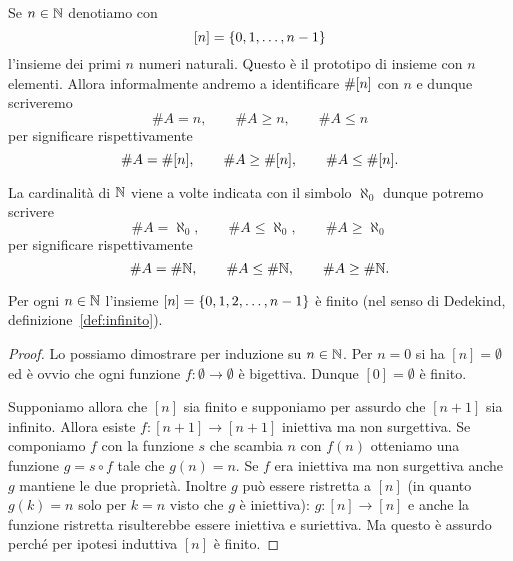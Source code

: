 \begin{definition}
Se $n\in {\mathbb N}$ denotiamo con 
\[
  {\left[ n \right]} = {\left\{ 0,1,\dots, n-1 \right\}}
\]
l'insieme dei primi $n$ numeri naturali. 
Questo è il prototipo di insieme con $n$ elementi.
Allora informalmente andremo a identificare $\#{\left[ n \right]}$ con $n$ e 
dunque scriveremo 
\[
   \#A = n, \qquad \#A\ge n, \qquad \#A\le n
\]
per significare rispettivamente
\[
  \#A = \#{\left[ n \right]}, \qquad \#A \ge \#{\left[ n \right]}, \qquad \#A\le \#{\left[ n \right]}.  
\]

La cardinalità di ${\mathbb N}$ viene a volte indicata con il simbolo
%
%
$\aleph_0$ dunque potremo scrivere  
%
\[
    \# A = \aleph_0, \qquad
    \#A \le \aleph_0, \qquad
    \# A\ge \aleph_0
\]
per significare rispettivamente 
\[
  \# A = \# {\mathbb N}, \qquad
  \# A \le \# {\mathbb N}, \qquad
  \# A \ge \# {\mathbb N}.  
\]
\end{definition}
  
\begin{lemma}\label{lm:nfinito}
Per ogni $n\in {\mathbb N}$ l'insieme $[n]={\left\{ 0,1,2, \dots, n-1 \right\}}$ è 
finito (nel senso di Dedekind, definizione~\ref{def:infinito}).
\end{lemma}
%
\begin{proof}
Lo possiamo dimostrare per induzione su $n\in {\mathbb N}$.
Per $n=0$ si ha $[n]=\emptyset$ ed è ovvio che ogni funzione 
$f\colon \emptyset \to \emptyset$ è bigettiva. 
Dunque $[0]=\emptyset$ è finito.

Supponiamo allora che $[n]$ sia finito e supponiamo per assurdo che $[n+1]$ sia 
infinito.
Allora esiste $f\colon [n+1]\to[n+1]$ iniettiva ma non surgettiva. 
Se componiamo $f$ con la funzione $s$ che scambia $n$ con $f(n)$ otteniamo 
una funzione $g = s\circ f$ tale che $g(n)=n$.
Se $f$ era iniettiva ma non surgettiva anche $g$ mantiene le due proprietà.
Inoltre $g$ può essere ristretta a $[n]$ (in quanto $g(k)=n$ solo per $k=n$ 
visto che $g$ è iniettiva): $g\colon [n]\to [n]$
e anche la funzione ristretta risulterebbe essere iniettiva e suriettiva.
Ma questo è assurdo perché per ipotesi induttiva $[n]$ è finito.
\end{proof}

